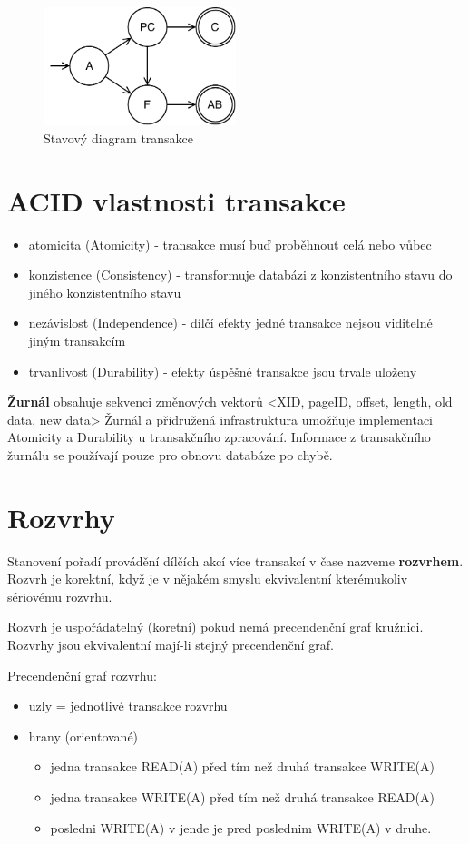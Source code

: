 \documentclass{szzclass}
\begin{document}
\begin{figure}[h!]
  \includegraphics[width=0.5\textwidth]{topics/bi-spol-10/images/state}
  \caption{Stavový diagram transakce}
\end{figure}

\section{ACID vlastnosti transakce}
\begin{itemize}
\item atomicita (Atomicity) - transakce musí buď proběhnout celá nebo vůbec
\item konzistence (Consistency) - transformuje databázi z konzistentního stavu do jiného konzistentního stavu
\item nezávislost (Independence) - dílčí efekty jedné transakce nejsou viditelné jiným transakcím
\item trvanlivost (Durability) - efekty úspěšné transakce jsou trvale uloženy
\end{itemize}

\textbf{Žurnál} obsahuje sekvenci změnových vektorů <XID, pageID, offset, length, old data, new data>
Žurnál a přidružená infrastruktura umožňuje implementaci Atomicity a Durability u transakčního zpracování.
Informace z transakčního žurnálu se používají pouze pro obnovu databáze po chybě.

\section{Rozvrhy}
Stanovení pořadí provádění dílčích akcí více transakcí v čase nazveme \textbf{rozvrhem}. Rozvrh je korektní, když je v nějakém smyslu ekvivalentní kterémukoliv sériovému rozvrhu.

Rozvrh je uspořádatelný (koretní) pokud nemá precendenční graf kružnici.
Rozvrhy jsou ekvivalentní mají-li stejný precendenční graf.

Precendenční graf rozvrhu:
\begin{itemize}
\item uzly = jednotlivé transakce rozvrhu
\item hrany (orientované)
  \begin{itemize}
  \item jedna transakce READ(A) před tím než druhá transakce WRITE(A)
  \item jedna transakce WRITE(A) před tím než druhá transakce READ(A)
  \item posledni WRITE(A) v jende je pred poslednim WRITE(A) v druhe.
  \end{itemize}
\end{itemize}
\end{document}
